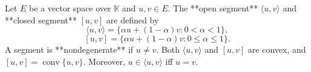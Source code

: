 Let $E$ be a vector space over $\mathbb{K}$ and $u, v \in E$. The **open segment** $\langle u, v \rangle$ and **closed segment** $[u, v]$ are defined by
$$\langle u, v \rangle = \{\alpha u + (1 - \alpha)v : 0 < \alpha < 1\},$$
$$[u, v] = \{\alpha u + (1 - \alpha)v : 0 \leq \alpha \leq 1\}.$$
A segment is **nondegenerate** if $u \neq v$. Both $\langle u, v \rangle$ and $[u, v]$ are convex, and $[u, v] = \operatorname{conv}\{u, v\}$. Moreover, $u \in \langle u, v \rangle$ iff $u = v$.

